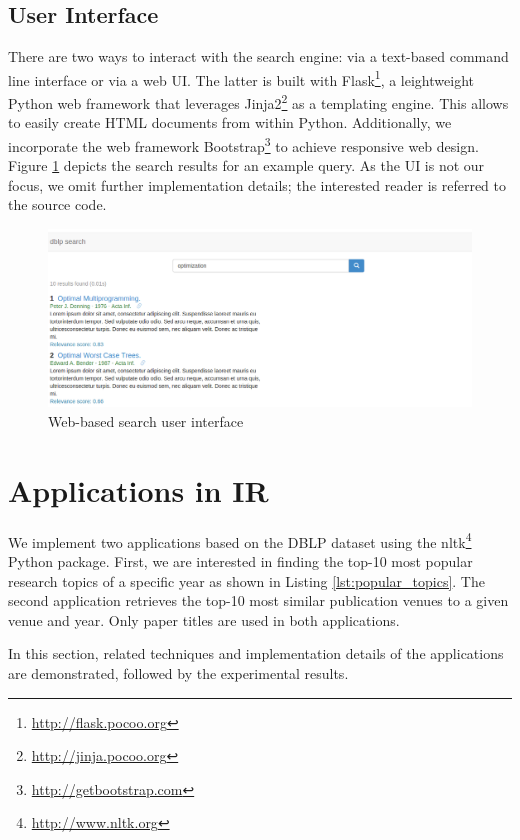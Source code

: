 \documentclass{sig-alternate-05-2015}
\begin{document}
\subsection{User Interface}

There are two ways to interact with the search engine: via a text-based command line interface or via a web UI. The latter is built with Flask\footnote{\url{http://flask.pocoo.org}}, a leightweight Python web framework that leverages Jinja2\footnote{\url{http://jinja.pocoo.org}} as a templating engine. This allows to easily create HTML documents from within Python. Additionally, we incorporate the web framework Bootstrap\footnote{\url{http://getbootstrap.com}} to achieve responsive web design. Figure \ref{fig:search} depicts the search results for an example query. As the UI is not our focus, we omit further implementation details; the interested reader is referred to the source code.

\begin{figure}[th]
\centering
\includegraphics[width=.8\textwidth]{img/search}
\caption{Web-based search user interface}
\label{fig:search}
\end{figure}

\section{Applications in IR} \label{sec:ir}
We implement two applications based on the DBLP dataset using the nltk\footnote{\url{http://www.nltk.org}} Python package. First, we are interested in finding the top-10 most popular research topics of a specific year as shown in Listing \ref{lst:popular_topics}. The second application retrieves the top-10 most similar publication venues to a given venue and year. Only paper titles are used in both applications.

In this section, related techniques and implementation details of the applications are demonstrated, followed by the experimental results.
\end{document}
